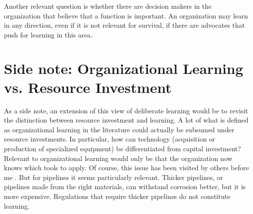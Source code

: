 \documentclass[12pt, man, natbib]{apa6}
\begin{document}
	Another relevant question is whether there are decision makers in the organization that believe that a function is important. An organization may learn in any direction, even if it is not relevant for survival, if there are advocates that push for learning in this area.
	
	\section{Side note: Organizational Learning vs. Resource Investment}
	
	As a side note, an extension of this view of deliberate learning would be to revisit the distinction between resource investment and learning. A lot of what is defined as organizational learning in the literature could actually be subsumed under resource investments. In particular, how can technology (acquisition or production of specialized equipment) be differentiated from capital investment? Relevant to organizational learning would only be that the organization now knows which tools to apply. Of course, this issue has been visited by others before me \citep[5]{Argote2013a}. But for pipelines it seems particularly relevant. Thicker pipelines, or pipelines made from the right materials, can withstand corrosion better, but it is more expensive. Regulations that require thicker pipelines do not constitute learning.


\end{document}
